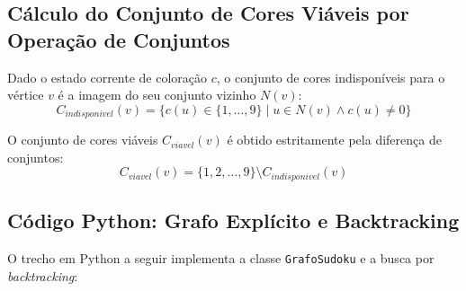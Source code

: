 \documentclass[12pt, a4paper]{article}
\begin{document}
\subsection{Cálculo do Conjunto de Cores Viáveis por Operação de Conjuntos}
Dado o estado corrente de coloração $c$, o conjunto de cores indisponíveis para o vértice $v$ é a imagem do seu conjunto vizinho $N(v)$:
\begin{equation}
    C_{indisponivel}(v) = \{ c(u) \in \{1, \dots, 9\} \mid u \in N(v) \land c(u) \neq 0 \}
\end{equation}

O conjunto de cores viáveis $C_{viavel}(v)$ é obtido estritamente pela diferença de conjuntos:
\begin{equation}
    C_{viavel}(v) = \{1, 2, \dots, 9\} \setminus C_{indisponivel}(v)
\end{equation}

\subsection{Código Python: Grafo Explícito e Backtracking}
O trecho em Python a seguir implementa a classe \texttt{GrafoSudoku} e a busca por \textit{backtracking}:
\end{document}
